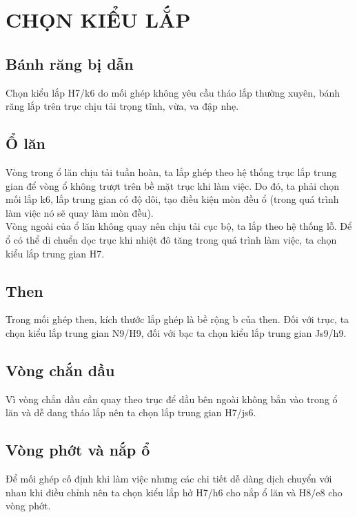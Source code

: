     \section{CHỌN KIỂU LẮP}
        \subsection{Bánh răng bị dẫn}
            \hspace*{0.6cm}Chọn kiểu lắp H7/k6 do mối ghép không yêu cầu tháo lắp thường xuyên, bánh răng lắp trên trục chịu tải trọng tĩnh, vừa, va đập nhẹ.
        \subsection{Ổ lăn}
            \hspace*{0.6cm}Vòng trong ổ lăn chịu tải tuần hoàn, ta lắp ghép theo hệ thống trục lắp trung gian để vòng ổ không trượt trên bề mặt trục khi làm việc. Do đó, ta phải chọn mối lắp k6, lắp trung gian có độ dôi, tạo điều kiện mòn đều ổ (trong quá trình làm việc nó sẽ quay làm mòn đều). \\
            \hspace*{0.6cm}Vòng ngoài của ổ lăn không quay nên chịu tải cục bộ, ta lắp theo hệ thống lỗ. Để ổ có thể di chuển dọc trục khi nhiệt đô tăng trong quá trình làm việc, ta chọn kiểu lắp trung gian H7.
        \subsection{Then}
            \hspace*{0.6cm}Trong mối ghép then, kích thước lắp ghép là bề rộng b của then. Đối với trục, ta chọn kiểu lắp trung gian N9/H9, đối với bạc ta chọn kiểu lắp trung gian Js9/h9.
        \subsection{Vòng chắn dầu}
            \hspace*{0.6cm}Vì vòng chắn dầu cần quay theo trục để dầu bên ngoài không bắn vào trong ổ lăn và dễ dang tháo lắp nên ta chọn lắp trung gian H7/js6.
        \subsection{Vòng phớt và nắp ổ}
            \hspace*{0.6cm}Để mối ghép cố định khi làm việc nhưng các chi tiết dễ dàng dịch chuyển với nhau khi điều chỉnh nên ta chọn kiểu lắp hở H7/h6 cho nắp ổ lăn và H8/e8 cho vòng phớt. 
